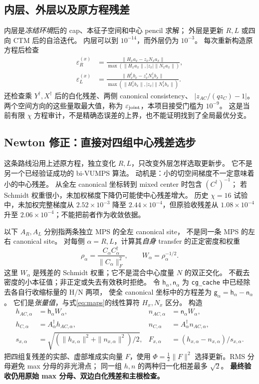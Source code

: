 \documentclass[11pt]{article}
\newcommand{\eps}{\varepsilon}
\newcommand{\code}[1]{{\small\texttt{#1}}}
\begin{document}
\subsection{内层、外层以及原方程残差}
内层是\emph{冻结环境}后的 cap、本征子空间和中心 pencil 求解；
外层是更新 $R,L$ 或四向 CTM 后的自洽迭代。
内层可以到 $10^{-14}$，而外层仍为 $10^{-3}$。
每次重新构造原方程后检查
\begin{align}
 \eps_R^{(x)}&=\frac{\|H_xa_x-z_xN_xa_x\|}
 {\max(\|H_xa_x\|,|z_x|\|N_xa_x\|)},\\
 \eps_L^{(x)}&=\frac{\|H_x^\dagger b_x-z_x^*N_x^\dagger b_x\|}
 {\max(\|H_x^\dagger b_x\|,|z_x|\|N_x^\dagger b_x\|)}.
\end{align}
还检查乘 $Y^\dagger,X^\dagger$ 后的白化残差、两侧 canonical consistency、
$|z_{AC}/(qz_C)-1|$。两个空间方向的这些量取最大值，称为
$\eps_{\rm joint}$，本项目接受门槛为 $10^{-9}$。
这是当前有限 $\chi$ 方程审计，不是精确态误差的上界，也不能证明找到了全局最优分支。

\subsection{Newton 修正：直接对四组中心残差选步}
\label{sec:newton}
这条路线沿用上述原方程，独立变化 $R,L$，只改变外层怎样选取更新步。
它不是另一个已经验证成功的 bi-VUMPS 算法。
动机是：小的切空间梯度不一定意味着小的中心残差。
从全左 canonical 坐标转到 mixed center 时包含 $(C^\dagger)^{-1}$；
若 Schmidt 权重很小，未加权梯度下降仍可能使中心残差增大。
历史 $\chi=16$ 试验中，未加权完整梯度从 $2.52\times10^{-3}$ 降至
$2.44\times10^{-4}$，但原验收残差从 $1.08\times10^{-4}$ 升至
$2.06\times10^{-4}$；不能把前者作为收敛依据。

以下 $A_R,A_L$ 分别指两条独立 MPS 的全左 canonical site，
不是同一条 MPS 的左右 canonical site。
对每侧 $\alpha=R,L$，计算其\emph{自身} transfer 的正定密度和权重
\begin{equation}
 \rho_\alpha=\frac{C_\alpha C_\alpha^\dagger}{\|C_\alpha\|_F^2},
 \qquad W_\alpha=\rho_\alpha^{-1/2}.
\end{equation}
这里 $W_\alpha$ 是残差的 Schmidt 权重；它不是混合中心度量 $N$ 的双正交化。
不截去密度的小本征值；非正定或失去有效秩时拒绝。
令 $\mathsf h_\alpha,\mathsf n_\alpha$ 为
\code{cg\_cache} 中已经除去各自行收缩标量的 H/N 两项，
使全 canonical 坐标中的方程差为 $\mathsf g_\alpha=\mathsf h_\alpha-\mathsf n_\alpha$。
它们是\emph{张量值}，与式\eqref{eq:maps}的线性算符 $H_x,N_x$ 区分。
构造
\begin{align}
 h_{AC,\alpha}&=\mathsf h_\alpha W_\alpha,&
 n_{AC,\alpha}&=\mathsf n_\alpha W_\alpha,\\
 h_{C,\alpha}&=A_\alpha^\dagger h_{AC,\alpha},&
 n_{C,\alpha}&=A_\alpha^\dagger n_{AC,\alpha},\\
 s_{x,\alpha}&=\sqrt{(\|h_{x,\alpha}\|^2+\|n_{x,\alpha}\|^2)/2},&
 F_{x,\alpha}&=(h_{x,\alpha}-n_{x,\alpha})/s_{x,\alpha}.
\end{align}
把四组复残差的实部、虚部堆成实向量 $F$，使用
$\Phi=\tfrac12\|F\|^2$ 选择更新。RMS 分母避免 max 分母的非光滑点；
同一组 $h,n$ 的两种归一化相差最多 $\sqrt2$。
\textbf{最终验收仍用原始 max 分母、双边白化残差和主根检查。}
\end{document}
